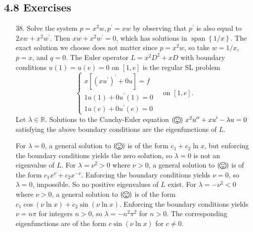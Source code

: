 \documentclass[11pt,leqno]{article}
\theoremstyle{plain}
\theoremstyle{definition}
\numberwithin{equation}{section}
\numberwithin{lem}{section}
\newcommand{\cbr}[1]{\left\{#1\right\}}
\DeclareMathOperator{\Span}{span}
\newcommand{\happy}{\raisebox{-.24em}{\resizebox{1.2em}{!}{\smiley}}}
\DeclareMathOperator{\mathhappy}{\!\happy\!}
\begin{document}
\subsection*{4.8 Exercises}
\begin{enumerate}
    \item[38.] Solve the system $p = x^2w, p^\prime = xw$ by observing that $p^\prime$ is also equal to $2xw + x^2w^\prime$. Then $xw + x^2w^\prime = 0$, which has solutions in $\Span\cbr{1/x}$. The exact solution we choose does not matter since $p = x^2w$, so take $w = 1/x$, $p = x$, and $q =0$. The Euler operator $L = x^2D^2 + xD$ with boundary conditions $u(1) = u(e) = 0$ on $[1,e]$ is the regular SL problem 
    \begin{equation*}
      \begin{cases*}
        x[(xu^\prime)^\prime + 0u] = f\\
        1u(1) + 0u^\prime(1) = 0\\
        1u(e) + 0u^\prime(e) = 0
      \end{cases*}\quad\text{on $[1,e]$.}
    \end{equation*}
    Let $\lambda\in\mathbb R$. Solutions to the Cauchy-Euler equation $(\mathhappy) ~ x^2u^{\prime\prime}+xu^\prime-\lambda u = 0$ satisfying the above boundary conditions are the eigenfunctions of $L$. 

    For $\lambda = 0$, a general solution to $(\mathhappy)$ is of the form $c_1 + c_2\ln x$, but enforcing the boundary conditions yields the zero solution, so $\lambda = 0$ is not an eigenvalue of $L$. For $\lambda = \nu^2 > 0$ where $\nu>0$, a general solution to $(\mathhappy)$ is of the form $c_1x^\nu + c_2x^{-\nu}$. Enforcing the boundary conditions yields $\nu = 0$, so $\lambda = 0$, impossible. So no positive eigenvalues of $L$ exist. For $\lambda = -\nu^2 < 0$ where $\nu>0$, a general solution to $(\mathhappy)$ is of the form $c_1\cos(\nu\ln x) + c_2\sin(\nu\ln x)$. Enforcing the boundary conditions yields $\nu = n\pi$ for integers $n > 0$, so $\lambda = -n^2\pi^2$ for $n > 0$. The corresponding eigenfunctions are of the form $c\sin(\nu\ln x)$ for $c\neq 0$.
\end{enumerate}
\end{document}
